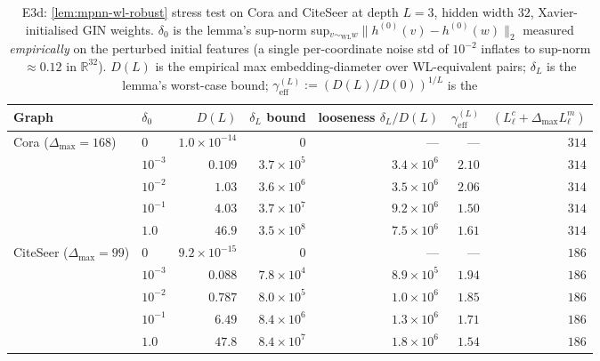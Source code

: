\documentclass[10pt]{article}
\theoremstyle{definition}
\theoremstyle{remark}
\begin{document}
\begin{table}[h]\centering\small
\begin{tabular}{llrrrrr}
\toprule
Graph & $\delta_{0}$ & $D(L)$ & $\delta_{L}$ bound
      & looseness $\delta_{L}/D(L)$ & $\gamma_{\mathrm{eff}}^{(L)}$
      & $(L^{c}_{\ell}{+}\Delta_{\max} L^{m}_{\ell})$ \\
\midrule
Cora ($\Delta_{\max}=168$)
   & $0$       & $1.0\!\times\!10^{-14}$ & $0$ & ---
                & ---   & $314$ \\
   & $10^{-3}$ & $0.109$          & $3.7\!\times\!10^{5}$
                & $3.4\!\times\!10^{6}$ & $2.10$ & $314$ \\
   & $10^{-2}$ & $1.03$            & $3.6\!\times\!10^{6}$
                & $3.5\!\times\!10^{6}$ & $2.06$ & $314$ \\
   & $10^{-1}$ & $4.03$            & $3.7\!\times\!10^{7}$
                & $9.2\!\times\!10^{6}$ & $1.50$ & $314$ \\
   & $1.0$     & $46.9$            & $3.5\!\times\!10^{8}$
                & $7.5\!\times\!10^{6}$ & $1.61$ & $314$ \\
\midrule
CiteSeer ($\Delta_{\max}=99$)
   & $0$       & $9.2\!\times\!10^{-15}$ & $0$ & ---
                & ---   & $186$ \\
   & $10^{-3}$ & $0.088$          & $7.8\!\times\!10^{4}$
                & $8.9\!\times\!10^{5}$ & $1.94$ & $186$ \\
   & $10^{-2}$ & $0.787$           & $8.0\!\times\!10^{5}$
                & $1.0\!\times\!10^{6}$ & $1.85$ & $186$ \\
   & $10^{-1}$ & $6.49$            & $8.4\!\times\!10^{6}$
                & $1.3\!\times\!10^{6}$ & $1.71$ & $186$ \\
   & $1.0$     & $47.8$            & $8.4\!\times\!10^{7}$
                & $1.8\!\times\!10^{6}$ & $1.54$ & $186$ \\
\bottomrule
\end{tabular}
\caption{E3d: \cref{lem:mpnn-wl-robust} stress test on Cora and
CiteSeer at depth $L = 3$, hidden width $32$, Xavier-initialised
GIN weights. $\delta_{0}$ is the lemma's
sup-norm sup$_{v \sim_{\mathrm{WL}} w}\|h^{(0)}(v) - h^{(0)}(w)\|_{2}$
measured \emph{empirically} on the perturbed initial features
(a single per-coordinate noise std of $10^{-2}$ inflates to
sup-norm $\approx 0.12$ in $\mathbb{R}^{32}$). $D(L)$ is the
empirical max embedding-diameter over WL-equivalent pairs;
$\delta_{L}$ is the lemma's worst-case bound;
$\gamma_{\mathrm{eff}}^{(L)} := (D(L)/D(0))^{1/L}$ is the
}
\end{table}
\end{document}
